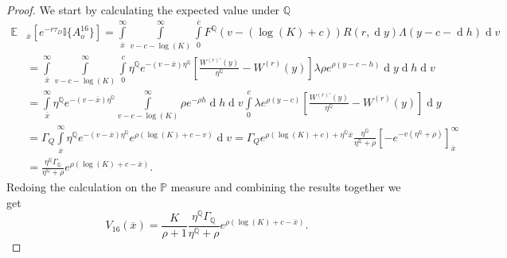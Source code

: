 \documentclass[10pt,a4paper]{amsart}
\def\E{{\mathbb{E}}}
\def\P{{\mathbb{P}}}
\def\Q{{\mathbb{Q}}}
\def \R{{{\rm I{\!}\rm R}}}
\def \I{{\mathbb{I}}}
\newcommand{\dx}{\operatorname{d}\!}
\def\P{{\mathbb P}} \def\le{\left} \def\ri{\right} \def\i{\infty}
\def\E{{\mathbb E}} \def\PP{\mc P} \def\Z{{\mathbb Z}} \def\R{{\mathbb R}}
\begin{document}
\begin{proof}
			We start by calculating the expected value under $\Q$
			\begin{align*}\label{V_K16}
				\E&_{\overline{x}}\left[ e^{-r\tau_D} \I \{ A_o^{16} \} \right] = \int\limits_{\overline{x}}^{\infty} \int\limits_{v-c-\log(K)}^{\infty}\int\limits_{0}^{c}F^\Q(v-(\log(K)+c))   R(r,\dx y) 	\Lambda(y-c-\dx h)   \dx v
				\\
				\nonumber&= \int\limits_{\overline{x}}^{\infty} \int\limits_{v-c-\log(K)}^{\infty}\int\limits_{0}^{c} \eta^\Q e^{-( v - \overline{x} )\eta^\Q} \left[ \frac{W^{(r)'}(y)}{\eta^{\Q}} - W^{(r)}(y) \right] \lambda\rho e^{\rho(y-c-h)} \dx y \dx h \dx v
				\\
				\nonumber&=  \int\limits_{\overline{x}}^{\infty} \eta^\Q  e^{-( v -\overline{x} )\eta^\Q}
				\int\limits_{v-c-\log(K)}^{\infty} \rho e^{ - \rho h} \dx h \dx v \int\limits_{0}^{c} \lambda e^{\rho(y-c)} \left[ \frac{W^{(r)'}(y)}{\eta^{\Q}} - W^{(r)}(y) \right] \dx y
				\\
				\nonumber&= \Gamma_Q \int\limits_{\overline{x}}^{\infty} \eta^\Q  e^{-( v - \overline{x} )\eta^\Q} e^{\rho(\log(K)+c-v)} \dx v  = \Gamma_Q e^{\rho (\log(K)+c) + \eta^\Q \overline{x}}\frac{\eta^\Q}{\eta^\Q + \rho} \left[ -e^{-v\left(\eta^\Q + \rho\right)} \right]^{\infty}_{\overline{x}} \\
				\nonumber&= \frac{\eta^\Q \Gamma_\Q}{\eta^\Q + \rho} e^{\rho( \log(K) + c - \overline{x} )}.	
			\end{align*}
			Redoing the calculation on the $\P$ measure and combining the results together we get
			\begin{equation}
				V_{16}(\overline{x}) = \frac{K}{\rho+1}\frac{\eta^\Q \Gamma_\Q}{\eta^\Q + \rho} e^{\rho( \log(K) + c - \overline{x} )}. \label{V16}
			\end{equation}
		\end{proof}
\end{document}
